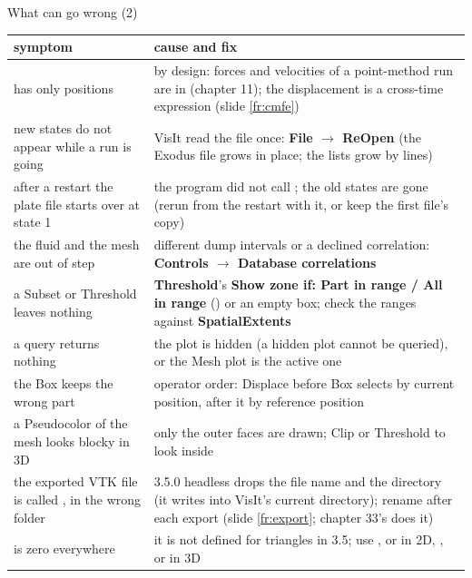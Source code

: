 \documentclass[aspectratio=169,11pt]{beamer}
\newcommand{\gui}[1]{\textsf{\textbf{#1}}}
\begin{document}
\begin{frame}{What can go wrong (2)}
\label{fr:wrong2}
\scriptsize
\renewcommand{\arraystretch}{0.9}
\begin{tabular}{@{}L{0.36\textwidth}L{0.57\textwidth}@{}}
\toprule
symptom & cause and fix \\
\midrule
{} has only positions & by design: forces and velocities of a point-method run are in  (chapter 11); the displacement is a cross-time expression (slide \ref{fr:cmfe}) \\
new states do not appear while a run is going & VisIt read the file once: \gui{File $\to$ ReOpen} (the Exodus file grows in place; the  lists grow by lines) \\
after a restart the plate file starts over at state 1 & the program did not call ; the old states are gone (rerun from the restart with it, or keep the first file's copy) \\
the fluid and the mesh are out of step & different dump intervals or a declined correlation: \gui{Controls $\to$ Database correlations} \\
a Subset or Threshold leaves nothing & \gui{Threshold}'s \gui{Show zone if: Part in range / All in range} () or an empty box; check the ranges against \gui{SpatialExtents} \\
a query returns nothing & the plot is hidden (a hidden plot cannot be queried), or the Mesh plot is the active one \\
the Box keeps the wrong part & operator order: Displace before Box selects by current position, after it by reference position \\
a Pseudocolor of the mesh looks blocky in 3D & only the outer faces are drawn; Clip or Threshold to look inside \\
the exported VTK file is called , in the wrong folder & 3.5.0 headless drops the file name and the directory (it writes into VisIt's current directory); rename after each export (slide \ref{fr:export}; chapter 33's  does it) \\
 is zero everywhere & it is not defined for triangles in 3.5; use ,  or  in 2D, ,  or  in 3D \\
\bottomrule
\end{tabular}
\end{frame}
\end{document}
